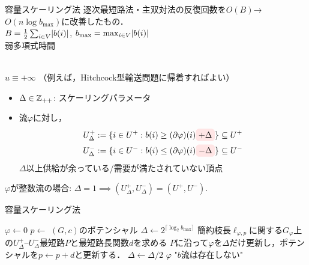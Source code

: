 \documentclass[14pt,aspectratio=169,xcolor=dvipsnames,table,onlytextwidth,dvipdfmx]{beamer}
\begin{document}

\begin{frame}{容量スケーリング法}
    \small
    逐次最短路法・主双対法の反復回数を$O(B)$→$O(n \log b_{\max})$に改善したもの． \\
    {\hfill\footnotesize $B = \frac{1}{2} \sum_{i \in V}\lvert b(i)\rvert$, $b_{\max} = \max_{i \in V} \lvert b(i)\rvert$} \\
    \hfill \alert{弱多項式時間}

    \vfill
     \\
    $u \equiv +\infty$ （{\footnotesize 例えば，Hitchcock型輸送問題に帰着すればよい}）

    \vfill
    \bigskip
    \begin{itemize}
        \item $\Delta \in \mathbb{Z}_{++}$: スケーリングパラメータ
        \item 流$\varphi$に対し，
        \begin{align*}
            U^+_\Delta &:= \{i \in U^+ : b(i) \geq (\partial\varphi)(i) \highlight{$+ \Delta$} \} \subseteq U^+ \\
            U^-_\Delta &:= \{i \in U^- : b(i) \leq (\partial\varphi)(i) \highlight{$- \Delta$} \} \subseteq U^-
        \end{align*}
        \dotfill \alert{$\Delta$以上}供給が余っている/需要が満たされていない頂点
    \end{itemize}
    $\varphi$が整数流の場合: $\Delta = 1 \implies (U^+_\Delta, U^-_\Delta) = (U^+, U^-)$.
\end{frame}


\begin{frame}{容量スケーリング法}
    \small
    \begin{block}{}
        \begin{algorithmic}[1]
            \STATE $\varphi \gets 0$ 
            \STATE $p \gets$ $(G, c)$のポテンシャル 
            \STATE $\Delta \gets 2^{\lceil \log_2 b_{\max} \rceil}$ 
                \STATE 簡約枝長$\ell_{\varphi,p}$に関する$G_\varphi$上の$U^+_\Delta$--$U^-_\Delta$最短路$P$と最短路長関数$d$を求める 
                \STATE $P$に沿って$\varphi$を$\Delta$だけ更新し，ポテンシャルを$p \gets p + d$と更新する．
            \ELSE
                \STATE $\Delta \gets \Delta / 2$ 
            \ENDIF
            \ENDWHILE
                \RETURN $\varphi$
            \ELSE
                \RETURN "$b$流は存在しない"
            \ENDIF
        \end{algorithmic}
    \end{block}
\end{frame}
\end{document}
